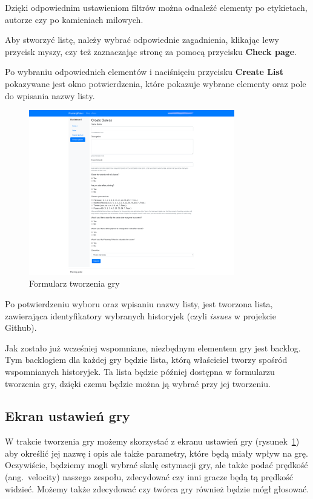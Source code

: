 Dzięki odpowiednim ustawieniom filtrów można odnaleźć elementy po etykietach,
autorze czy po kamieniach milowych.

Aby stworzyć listę, należy wybrać odpowiednie zagadnienia, klikając lewy przycisk myszy,
czy też zaznaczając stronę za pomocą przycisku \textbf{Check page}.

Po wybraniu odpowiednich elementów i naciśnięciu przycisku \textbf{Create List}
pokazywane jest okno potwierdzenia,
które pokazuje wybrane elementy oraz pole do wpisania nazwy listy.

\begin{figure}[h]
	\centering\includegraphics[width=0.8\textwidth]{img/formularz.png}
	\caption{Formularz tworzenia gry}\label{rys:form}%
\end{figure}

Po potwierdzeniu wyboru oraz wpisaniu nazwy listy, jest tworzona lista, zawierająca
identyfikatory wybranych historyjek (czyli \textit{issues} w projekcie Github).

Jak zostało już wcześniej wspomniane, niezbędnym elementem gry jest backlog.
Tym backlogiem dla każdej gry będzie lista, którą właściciel tworzy spośród wspomnianych historyjek.
Ta lista będzie później dostępna w formularzu tworzenia gry,
dzięki czemu będzie można ją wybrać przy jej tworzeniu.


\subsection{Ekran ustawień gry}

W trakcie tworzenia gry możemy skorzystać z ekranu ustawień gry (rysunek~\ref{rys:form})
aby określić jej nazwę i opis ale także parametry, które będą miały wpływ na grę.
Oczywiście, będziemy mogli wybrać skalę estymacji gry, ale także podać prędkość (ang.\ velocity)
naszego zespołu, zdecydować czy inni gracze będą tą prędkość widzieć.
Możemy także zdecydować czy twórca gry również będzie mógł głosować.

